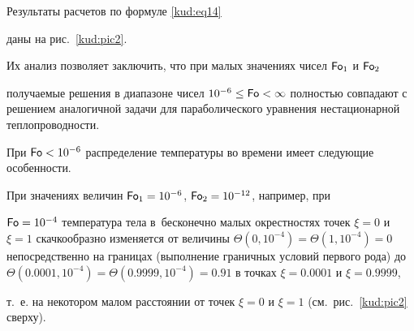 Результаты расчетов по формуле \eqref{kud:eq14} %

даны на рис.~\ref{kud:pic2}. 

Их анализ позволяет заключить, что при малых значениях чисел $\operatorname{\sf Fo}_1 $ и $\operatorname{\sf Fo}_2 $

получаемые решения в диапазоне чисел $10^{-6}\le \operatorname{\sf Fo}<\infty $ полностью совпадают с решением аналогичной задачи для параболического уравнения нестационарной теплопроводности.



При $\operatorname{\sf Fo}<10^{-6}$ распределение температуры во времени имеет следующие особенности. 

При значениях величин $\operatorname{\sf Fo}_1 =10^{-6}$, $\operatorname{\sf Fo}_2 =10^{-12}$, например, при

$\operatorname{\sf Fo}=10^{-4}$ температура тела в~бесконечно малых окрестностях точек $ \xi=0$ и $ \xi=1$ скачкообразно изменяется от величины $ \Theta(0, 10^{-4})= \Theta(1, 10^{-4})=0$ непосредственно на границах (выполнение граничных условий первого рода) до $ \Theta(0.0001, 10^{-4})= \Theta(0.9999, 10^{-4})=0.91$ в точках $\xi=0.0001$ и $\xi=0.9999$, 

т.~е. на некотором малом расстоянии от точек $\xi=0$ и $ \xi=1$ (см.~рис.~\ref{kud:pic2} сверху).





